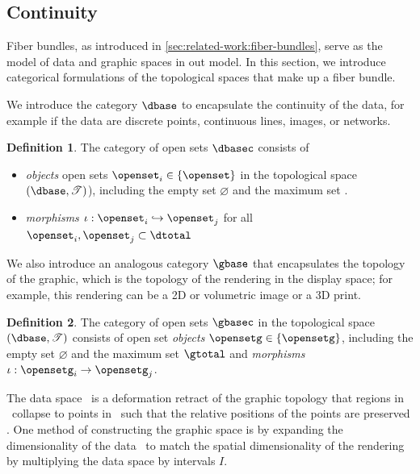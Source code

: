 \documentclass[10pt,journal,compsoc]{IEEEtran}
\theoremstyle{definition}
\newtheorem{definition}{Definition}[section]
\theoremstyle{remark}
\begin{document}
\subsection{Continuity}
\label{sec:artist:category}

Fiber bundles, as introduced in \autoref{sec:related-work:fiber-bundles}, serve as the model of data and graphic spaces in out model. In this section, we introduce categorical formulations of the topological spaces that make up a fiber bundle. 

We introduce the category $\mathcal{\dbase}$ to encapsulate the continuity of the data, for example if the data are discrete points, continuous lines, images, or networks. 
\begin{definition} \label{def:category:K} The category of open sets $\mathcal{\dbasec}$ consists of
  \begin{itemize}
    \item \textit{objects} open sets $\openset_{i} \in \{\openset\}$ in the topological space $(\dbase, \mathscr{T})$), including the empty set $\varnothing$ and the maximum set \dbase. 
    \item \textit{morphisms} $\iota: \openset_{i} \hookrightarrow \openset_{j}$ for all  $\openset_i, \openset_j \subset \dtotal$
  \end{itemize} 
\end{definition}

We also introduce an analogous category $\mathcal{\gbase}$ that encapsulates the topology of the graphic, which is the topology of the rendering in the display space; for example, this rendering can be a 2D or volumetric image or a 3D print. 

\begin{definition} The category of open sets $\mathcal{\gbasec}$ in the topological space $(\dbase, \mathscr{T})$ consists of open set \textit{objects} $\opensetg \in \{\opensetg\}$, including the empty set $\varnothing$ and the maximum set $\gtotal$ and \textit{morphisms} $\iota: \opensetg_i \rightarrow \opensetg_j$.  
\end{definition}

The data space \dbase\ is a deformation retract of the graphic topology \gbase\meaning that regions in \gbase\ collapse to points in \dbase\ such that the relative positions of the points are preserved \cite{nlab:deformation_retract}. One method of constructing the graphic space is by expanding the dimensionality of the data \dbase\ to match the spatial dimensionality of the rendering by multiplying the data space by  intervals $I$. 
\end{document}
